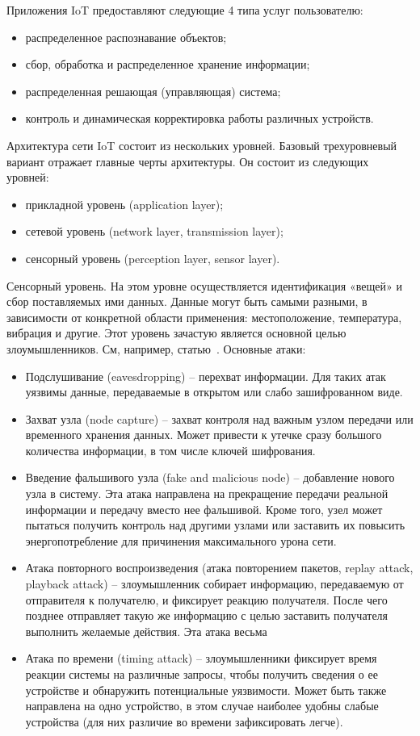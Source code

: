 Приложения IoT предоставляют следующие 4 типа услуг пользователю:
\begin{itemize}
	\item распределенное распознавание объектов;
	\item сбор, обработка и распределенное хранение информации;
	\item распределенная решающая (управляющая) система;
	\item контроль и динамическая корректировка работы различных устройств.
\end{itemize}

Архитектура сети IoT состоит из нескольких уровней. Базовый трехуровневый вариант отражает главные черты архитектуры. Он состоит из следующих уровней:
\begin{itemize}
	\item прикладной уровень (application layer);
	\item сетевой уровень (network layer, transmission layer);
	\item сенсорный уровень (perception layer, sensor layer). 	
\end{itemize}

Сенсорный уровень. На этом уровне осуществляется идентификация «вещей» и сбор поставляемых ими данных. Данные могут быть самыми разными, в зависимости от конкретной области применения: местоположение, температура, вибрация и другие. Этот уровень зачастую является основной целью злоумышленников. См, например, статью~\cite{src21}. Основные атаки:
\begin{itemize}
	\item Подслушивание (eavesdropping) – перехват информации. Для таких атак уязвимы данные, передаваемые в открытом или слабо зашифрованном виде.
	\item Захват узла (node capture) – захват контроля над важным узлом передачи или временного хранения данных. Может привести к утечке сразу большого количества информации, в том числе ключей шифрования.
	\item Введение фальшивого узла (fake and malicious node) – добавление нового узла в систему. Эта атака направлена на прекращение передачи реальной информации и передачу вместо нее фальшивой. Кроме того, узел может пытаться получить контроль над другими узлами или заставить их повысить энергопотребление для причинения максимального урона сети.
	\item Атака повторного воспроизведения (атака повторением пакетов, replay attack, playback attack) – злоумышленник собирает информацию, передаваемую от отправителя к получателю, и фиксирует реакцию получателя. После чего позднее отправляет такую же информацию с целью заставить получателя выполнить желаемые действия. Эта атака весьма
	\item Атака по времени (timing attack) – злоумышленники фиксирует время реакции системы на различные запросы, чтобы получить сведения о ее устройстве и обнаружить потенциальные уязвимости. Может быть также направлена на одно устройство, в этом случае наиболее удобны слабые устройства (для них различие во времени зафиксировать легче).
\end{itemize}


